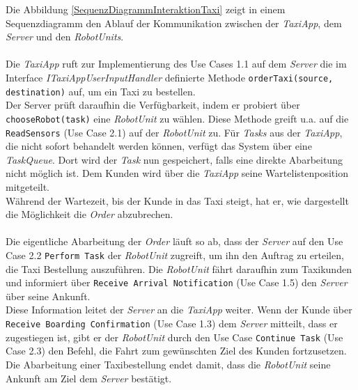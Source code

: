 Die Abbildung \ref{SequenzDiagrammInteraktionTaxi} zeigt in einem Sequenzdiagramm den Ablauf der Kommunikation zwischen der \emph{TaxiApp}, dem \emph{Server} und den \emph{RobotUnits}.\\ \\
Die \emph{TaxiApp} ruft zur Implementierung des Use Cases 1.1 auf dem \emph{Server} die im Interface \emph{ITaxiAppUserInputHandler} definierte Methode \texttt{orderTaxi(source, destination)} auf, um ein Taxi zu bestellen. \\ Der Server prüft daraufhin die Verfügbarkeit, indem er probiert über \texttt{chooseRobot(task)} eine \emph{RobotUnit} zu wählen. Diese Methode greift u.a. auf die \texttt{ReadSensors} (Use Case 2.1) auf der \emph{RobotUnit} zu.
Für \emph{Tasks} aus der \emph{TaxiApp}, die nicht sofort behandelt werden können, verfügt das System über eine \emph{TaskQueue}. Dort wird der \emph{Task} nun gespeichert, falls eine direkte Abarbeitung nicht möglich ist. Dem Kunden wird über die \emph{TaxiApp} seine Wartelistenposition mitgeteilt. \\
Während der Wartezeit, bis der Kunde in das Taxi steigt, hat er, wie dargestellt die Möglichkeit die \emph{Order} abzubrechen. \\ \\
Die eigentliche Abarbeitung der \emph{Order} läuft so ab, dass der \emph{Server} auf den Use Case 2.2 \texttt{Perform Task} der \emph{RobotUnit} zugreift, um ihn den Auftrag zu erteilen, die Taxi Bestellung auszuführen. Die \emph{RobotUnit} fährt daraufhin zum Taxikunden und informiert über \texttt{Receive Arrival Notification} (Use Case 1.5) den \emph{Server} über seine Ankunft. \\
Diese Information leitet der \emph{Server} an die \emph{TaxiApp} weiter. Wenn der Kunde über \texttt{Receive Boarding Confirmation} (Use Case 1.3) dem \emph{Server} mitteilt, dass er zugestiegen ist, gibt er der \emph{RobotUnit} durch den Use Case \texttt{Continue Task} (Use Case 2.3) den Befehl, die Fahrt zum gewünschten Ziel des Kunden fortzusetzen. Die Abarbeitung einer Taxibestellung endet damit, dass die \emph{RobotUnit} seine Ankunft am Ziel dem \emph{Server} bestätigt.

